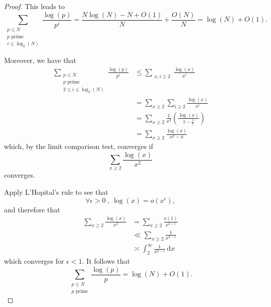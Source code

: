 \documentclass[12pt,reqno]{amsart}
\begin{document}
\begin{proof}
This leads to
\[
    \sum _{\substack{ p \leq N \\ p \text{ prime} \\ i \leq \log _{2} \left( N \right) }} \frac{\log \left( p \right) }{p ^{i}} = \frac{N \log \left( N \right) - N + O(1)}{N} + \frac{O(N)}{N} = \log \left( N \right)  + O(1)
.\]

Moreover, we have that
\begin{align*}
\sum  _{\substack{ p \leq N \\ p \text{ prime} \\ 2 \leq i \leq \log _{2} \left( N \right)  }} \frac{\log \left( p \right) }{p ^{i}} & \leq \sum  _{\substack{ x,i \geq 2}} \frac{\log \left( x \right) }{x ^{i}} \\
& = \sum _{x \geq 2} \sum _{i \geq 2} \frac{\log \left( x \right) }{x^{i}} \\
& = \sum _{x \geq 2} \frac{1}{x^{2}} \left( \frac{\log \left( x \right) }{1-\frac{1}{x} }  \right)\\
& = \sum _{x \geq 2} \frac{\log \left( x \right) }{x ^{2} - x} 
\end{align*}
which, by the limit comparison test, converges if
\[
    \sum _{x \geq 2} \frac{\log \left( x \right) }{x^{2}}
\]
converges.

Apply L'Hopital's rule to see that
\[
    \forall \epsilon > 0 ~,~ \log \left( x \right) = o(x^{\epsilon})
,\]
and therefore that
\begin{align*}
\sum _{x \geq 2} \frac{\log \left( x \right)}{x ^{2}} & = \sum _{x\geq 2} \frac{o(1)}{x^{2 - \epsilon}} \\
& \ll \sum _{x \geq 2} \frac{1}{x^{2-\epsilon}} \\
& \asymp \int_{2}^{\infty} \frac{1}{x^{2-\epsilon}}  ~\mathrm{d} x 
\end{align*}
which converges for \(\epsilon < 1\). It follows that
\[
    \sum _{\substack{ p \leq N \\p \text{ prime}  }}\frac{ \log \left( p \right) }{p} = \log \left( N \right) + O(1)
.\]


\end{proof}
\end{document}
